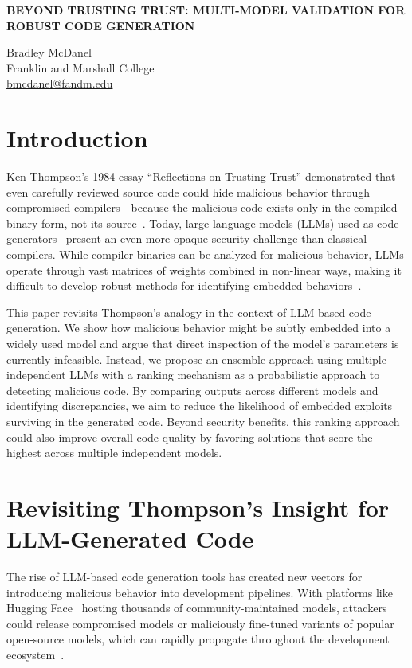 \documentclass[12pt]{article}
\newcommand{\papertitle}[1]{%
  {\fontsize{14pt}{16pt}\selectfont \textbf{\MakeUppercase{#1}}\par}
}
\newenvironment{authblock}{\vspace{0.5\baselineskip}}{\vspace{\baselineskip}}
\begin{document}
\papertitle{Beyond Trusting Trust: Multi-Model Validation for Robust Code Generation}

\begin{authblock}
Bradley McDanel\\
Franklin and Marshall College\\
\url{bmcdanel@fandm.edu}
\end{authblock}
\vspace{-1em}

\section{Introduction}
Ken Thompson's 1984 essay ``Reflections on Trusting Trust'' demonstrated that even carefully reviewed source code could hide malicious behavior through compromised compilers - because the malicious code exists only in the compiled binary form, not its source~\cite{thompson1984trust}. Today, large language models (LLMs) used as code generators~\cite{zhang2023planning,jiang2024survey} present an even more opaque security challenge than classical compilers. While compiler binaries can be analyzed for malicious behavior, LLMs operate through vast matrices of weights combined in non-linear ways, making it difficult to develop robust methods for identifying embedded behaviors~\cite{templeton2024scaling,das2024securityprivacychallengeslarge}.

This paper revisits Thompson's analogy in the context of LLM-based code generation. We show how malicious behavior might be subtly embedded into a widely used model and argue that direct inspection of the model's parameters is currently infeasible. Instead, we propose an ensemble approach using multiple independent LLMs with a ranking mechanism as a probabilistic approach to detecting malicious code. By comparing outputs across different models and identifying discrepancies, we aim to reduce the likelihood of embedded exploits surviving in the generated code. Beyond security benefits, this ranking approach could also improve overall code quality by favoring solutions that score the highest across multiple independent models.

\section{Revisiting Thompson's Insight for LLM-Generated Code}
\label{sec:llm_thompson}
The rise of LLM-based code generation tools has created new vectors for introducing malicious behavior into development pipelines. With platforms like Hugging Face~\cite{huggingface2024} hosting thousands of community-maintained models, attackers could release compromised models or maliciously fine-tuned variants of popular open-source models, which can rapidly propagate throughout the development ecosystem~\cite{esmradi2023comprehensive,shayegani2023survey,motlagh2024large}.
\end{document}
